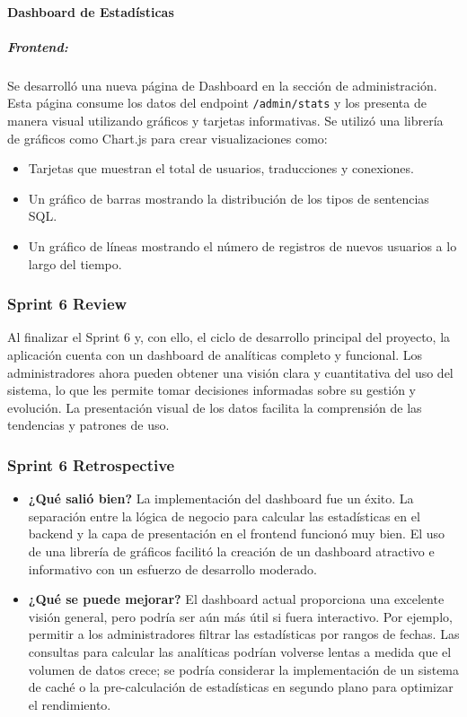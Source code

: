 \paragraph{Dashboard de Estadísticas}
\subparagraph{Frontend:}
Se desarrolló una nueva página de Dashboard en la sección de administración. Esta página consume los datos del endpoint \texttt{/admin/stats} y los presenta de manera visual utilizando gráficos y tarjetas informativas. Se utilizó una librería de gráficos como Chart.js para crear visualizaciones como:
\begin{itemize}
    \item Tarjetas que muestran el total de usuarios, traducciones y conexiones.
    \item Un gráfico de barras mostrando la distribución de los tipos de sentencias SQL.
    \item Un gráfico de líneas mostrando el número de registros de nuevos usuarios a lo largo del tiempo.
\end{itemize}

\subsubsection{Sprint 6 Review}
Al finalizar el Sprint 6 y, con ello, el ciclo de desarrollo principal del proyecto, la aplicación cuenta con un dashboard de analíticas completo y funcional. Los administradores ahora pueden obtener una visión clara y cuantitativa del uso del sistema, lo que les permite tomar decisiones informadas sobre su gestión y evolución. La presentación visual de los datos facilita la comprensión de las tendencias y patrones de uso.

\subsubsection{Sprint 6 Retrospective}
\begin{itemize}
    \item \textbf{¿Qué salió bien?} \newline
    La implementación del dashboard fue un éxito. La separación entre la lógica de negocio para calcular las estadísticas en el backend y la capa de presentación en el frontend funcionó muy bien. El uso de una librería de gráficos facilitó la creación de un dashboard atractivo e informativo con un esfuerzo de desarrollo moderado.
    
    \item \textbf{¿Qué se puede mejorar?} \newline
    El dashboard actual proporciona una excelente visión general, pero podría ser aún más útil si fuera interactivo. Por ejemplo, permitir a los administradores filtrar las estadísticas por rangos de fechas. Las consultas para calcular las analíticas podrían volverse lentas a medida que el volumen de datos crece; se podría considerar la implementación de un sistema de caché o la pre-calculación de estadísticas en segundo plano para optimizar el rendimiento.
    
\end{itemize}
